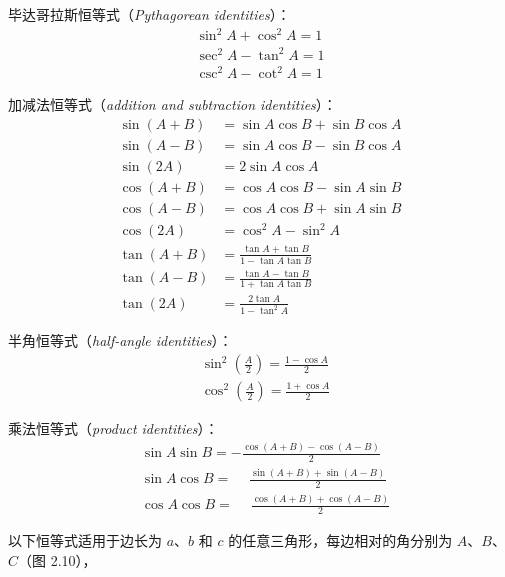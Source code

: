 \documentclass[lang=cn,12pt,marginpar=margintrue]{elegantbook}
\begin{document}
毕达哥拉斯恒等式（\textit{Pythagorean identities}）：
\[
  \begin{array}{r}
    \sin ^{2} A+\cos ^{2} A=1 \\
    \sec ^{2} A-\tan ^{2} A=1 \\
    \csc ^{2} A-\cot ^{2} A=1
  \end{array}
\]

加减法恒等式（\textit{addition and subtraction identities}）：
\[
  \begin{aligned}
    \sin (A+B) & =\sin A \cos B+\sin B \cos A             \\
    \sin (A-B) & =\sin A \cos B-\sin B \cos A             \\
    \sin (2 A) & =2 \sin A \cos A                         \\
    \cos (A+B) & =\cos A \cos B-\sin A \sin B             \\
    \cos (A-B) & =\cos A \cos B+\sin A \sin B             \\
    \cos (2 A) & =\cos ^{2} A-\sin ^{2} A                 \\
    \tan (A+B) & =\frac{\tan A+\tan {B}}{1-\tan A \tan B} \\
    \tan (A-B) & =\frac{\tan A-\tan B}{1+\tan A \tan B}   \\
    \tan (2 A) & =\frac{2 \tan A}{1-\tan^{2}A}
  \end{aligned}
\]

半角恒等式（\textit{half-angle identities}）：
\[
  \begin{aligned}
     & \sin ^{2}(\frac{A}{2})=\frac{1-\cos A}{2} \\
     & \cos ^{2}(\frac{A}{2})=\frac{1+\cos A}{2}
  \end{aligned}
\]

乘法恒等式（\textit{product identities}）：
\[
  \begin{aligned}
     & \sin A \sin B=-\frac{\cos (A+B)-\cos (A-B)}{2}           \\
     & \sin A \cos B=\phantom{-}\frac{\sin (A+B)+\sin (A-B)}{2} \\
     & \cos A \cos B=\phantom{-}\frac{\cos (A+B)+\cos (A-B)}{2}
  \end{aligned}
\]

以下恒等式适用于边长为 $a$、$b$ 和 $c$ 的任意三角形，每边相对的角分别为 $A$、$B$、$C$（图 2.10），

\end{document}
